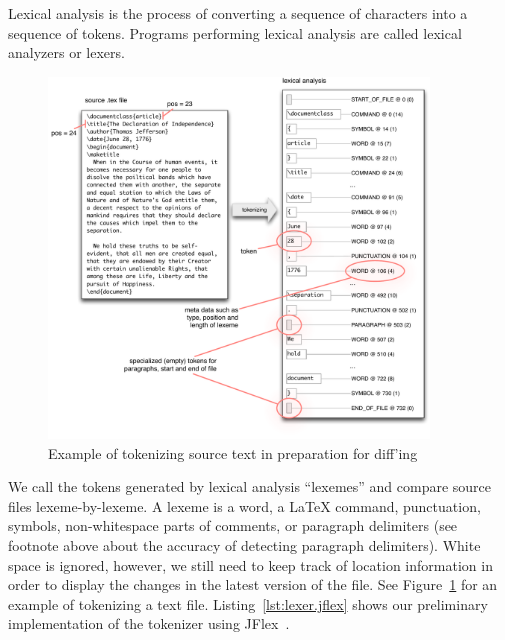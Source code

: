 Lexical analysis is the process of converting a sequence of characters into a sequence of tokens. Programs performing lexical analysis are called lexical analyzers or lexers.  

\begin{figure} 
\centering
\includegraphics[width=0.9\textwidth]{./figures/tokenizer-example}
\caption{Example of tokenizing source text in preparation for diff'ing} \label{fig:tokenizer-example}
\end{figure}



We call the tokens generated by lexical analysis ``lexemes'' and compare source files lexeme-by-lexeme.  A lexeme is a word, a LaTeX command, punctuation, symbols, non-whitespace parts of comments, or paragraph delimiters (see footnote above about the accuracy of detecting paragraph delimiters).  White space is ignored, however, we still need to keep track of location information in order to display the changes in the latest version of the file.  See Figure~\ref{fig:tokenizer-example} for an example of tokenizing a text file.  Listing~\ref{lst:lexer.jflex} shows our preliminary implementation of the tokenizer using JFlex~\cite{jflex}.

